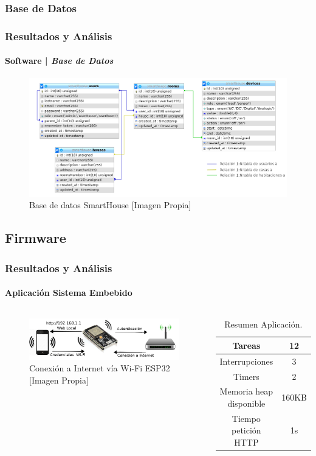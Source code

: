 \subsubsection{Base de Datos}
\begin{frame}
\frametitle{Resultados y Análisis}
\framesubtitle{Software | \emph{Base de Datos}}
\begin{figure}[H]
\centering
\caption{Base de datos SmartHouse [Imagen Propia]}
\label{fig:db}
\includegraphics[width=0.75\linewidth]{Imagenes/DB}
\end{figure}

\end{frame}


\subsection{Firmware}
\begin{frame}
\frametitle{Resultados y Análisis}
\framesubtitle{Aplicación Sistema Embebido}
\begin{columns}
\begin{figure}
	\centering
	\caption{Conexión a Internet vía Wi-Fi ESP32 [Imagen Propia]}
	\label{fig:conexion}
	\includegraphics[width=\linewidth]{Imagenes/conexion}
\end{figure}

\begin{table}[H]
	\begin{center}
		\caption{Resumen Aplicación.}
	\begin{tabular}{|c|c|}
		\hline 
		Tareas & 12 \\ 
		\hline 
		Interrupciones & 3 \\
		\hline
		Timers & 2 \\ 
		\hline 
		Memoria heap disponible & 160KB \\ 
		\hline 
		Tiempo petición HTTP & 1s \\ 
		\hline 
	\end{tabular} 
\end{center}
\end{table}
	
\end{columns}
\end{frame}

